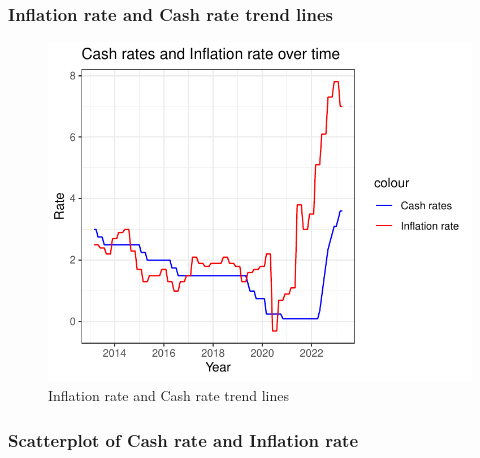 \documentclass[11pt,a4paper,]{article}
\begin{document}
\hypertarget{inflation-rate-and-cash-rate-trend-lines}{%
\subsubsection{Inflation rate and Cash rate trend lines}\label{inflation-rate-and-cash-rate-trend-lines}}

\begin{figure}[H]

{\centering \includegraphics{Inflation_Analysis_files/figure-latex/pllines-1} 

}

\caption{Inflation rate and Cash rate trend lines}\label{fig:pllines}
\end{figure}

\hypertarget{scatterplot-of-cash-rate-and-inflation-rate}{%
\subsubsection{Scatterplot of Cash rate and Inflation rate}\label{scatterplot-of-cash-rate-and-inflation-rate}}
\end{document}
